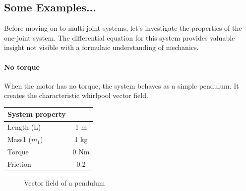 \documentclass{article}
\begin{document}
\newpage

\subsection{Some Examples...}
\noindent \justifying Before moving on to multi-joint systems, let's investigate the properties of the one-joint system. The differential equation for this system provides valuable insight not visible with a formulaic understanding of mechanics. 

\paragraph{No torque}
When the motor has no torque, the system behaves as a simple pendulum. It creates the characteristic whirlpool vector field. 
\begin{table}[h]
\centering
\begin{tabular}{|l|c|}
\hline
System property & \\
\hline
Length (L) & 1 m \\
Mass1 ($m_1$) & 1 kg \\
Torque & 0 Nm \\
Friction & 0.2 \\
\hline
\end{tabular}
\label{tab:quantities}
\end{table}
\begin{figure}[!h]
  \caption{Vector field of a pendulum}
  \label{fig:key}
\end{figure}

\newpage
\end{document}
